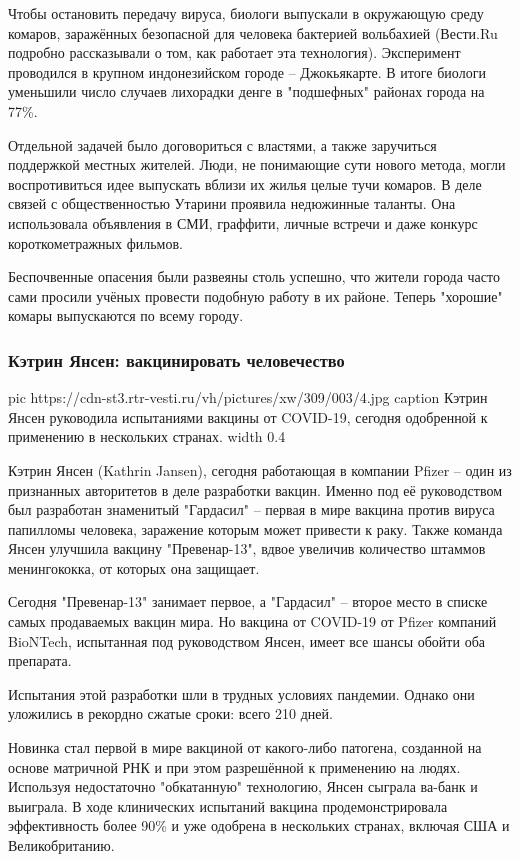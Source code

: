 Чтобы остановить передачу вируса, биологи выпускали в окружающую среду комаров,
заражённых безопасной для человека бактерией вольбахией (Вести.Ru подробно
рассказывали о том, как работает эта технология). Эксперимент проводился в
крупном индонезийском городе – Джокьякарте. В итоге биологи уменьшили число
случаев лихорадки денге в "подшефных" районах города на 77\%.

Отдельной задачей было договориться с властями, а также заручиться поддержкой
местных жителей. Люди, не понимающие сути нового метода, могли воспротивиться
идее выпускать вблизи их жилья целые тучи комаров. В деле связей с
общественностью Утарини проявила недюжинные таланты. Она использовала
объявления в СМИ, граффити, личные встречи и даже конкурс короткометражных
фильмов.

Беспочвенные опасения были развеяны столь успешно, что жители города часто сами
просили учёных провести подобную работу в их районе. Теперь "хорошие" комары
выпускаются по всему городу.


\subsubsection{Кэтрин Янсен: вакцинировать человечество}


\ifcmt
  pic https://cdn-st3.rtr-vesti.ru/vh/pictures/xw/309/003/4.jpg
	caption Кэтрин Янсен руководила испытаниями вакцины от COVID-19, сегодня одобренной к применению в нескольких странах.
  width 0.4
\fi

Кэтрин Янсен (Kathrin Jansen), сегодня работающая в компании Pfizer – один из
признанных авторитетов в деле разработки вакцин. Именно под её руководством был
разработан знаменитый "Гардасил" – первая в мире вакцина против вируса
папилломы человека, заражение которым может привести к раку. Также команда
Янсен улучшила вакцину "Превенар-13", вдвое увеличив количество штаммов
менингококка, от которых она защищает.

Сегодня "Превенар-13" занимает первое, а "Гардасил" – второе место в списке
самых продаваемых вакцин мира. Но вакцина от COVID-19 от Pfizer компаний
BioNTech, испытанная под руководством Янсен, имеет все шансы обойти оба
препарата.

Испытания этой разработки шли в трудных условиях пандемии. Однако они уложились
в рекордно сжатые сроки: всего 210 дней.

Новинка стал первой в мире вакциной от какого-либо патогена, созданной на
основе матричной РНК и при этом разрешённой к применению на людях. Используя
недостаточно "обкатанную" технологию, Янсен сыграла ва-банк и выиграла. В ходе
клинических испытаний вакцина продемонстрировала эффективность более 90\% и уже
одобрена в нескольких странах, включая США и Великобританию.

